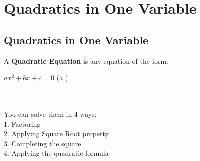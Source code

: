 \chapter{Quadratics in One Variable}

\section{Quadratics in One Variable}
A \textbf{Quadratic Equation} is any equation of the form:\\

\begin{center}
	$ax^2 + bx + c = 0$ (a )
\end{center}
\\\\
You can solve them in 4 ways:\\
1. Factoring\\
2. Applying Square Root property\\
3. Completing the square\\
4. Applying the quadratic formula\\

